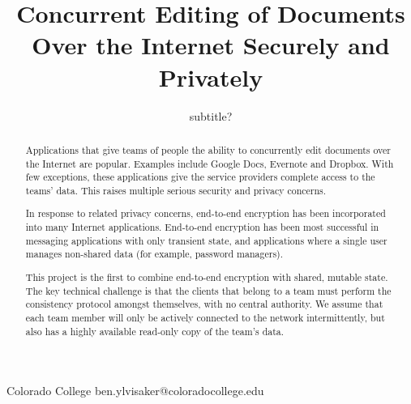\documentclass[pldi,10pt,preprint]{sigplanconf-pldi16}
\begin{document}
\newcommand{\LoginSalt}[1]{{$\textrm{LoginSalt}_{#1}$}}
\newcommand{\subscr}[2]{{$\textrm{#1}_{#2}$}}

\setlength{\pdfpageheight}{\paperheight}
\setlength{\pdfpagewidth}{\paperwidth}



\title{Concurrent Editing of Documents Over the Internet Securely and Privately}
\subtitle{subtitle?}

           {Colorado College}
           {ben.ylvisaker@coloradocollege.edu}

\maketitle

\begin{abstract}

Applications that give teams of people the ability to concurrently edit documents over the Internet are popular.
Examples include Google Docs, Evernote and Dropbox.
With few exceptions, these applications give the service providers complete access to the teams' data.
This raises multiple serious security and privacy concerns.

In response to related privacy concerns, end-to-end encryption has been incorporated into many Internet applications.
End-to-end encryption has been most successful in messaging applications with only transient state, and applications where a single user manages non-shared data (for example, password managers).

This project is the first to combine end-to-end encryption with shared, mutable state.
The key technical challenge is that the clients that belong to a team must perform the consistency protocol amongst themselves, with no central authority.
We assume that each team member will only be actively connected to the network intermittently, but also has a highly available read-only copy of the team's data.

\end{abstract}
\end{document}
